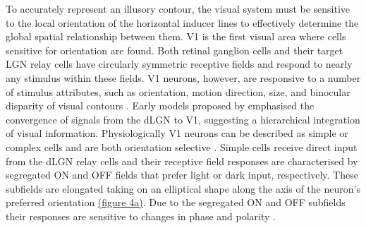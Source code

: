 \documentclass[12pt]{article}
\begin{document}


To accurately represent an illusory contour, the visual system must be sensitive to the local orientation of the horizontal inducer lines to effectively determine the global spatial relationship between them. V1 is the first visual area where cells sensitive for orientation are found. Both retinal ganglion cells and their target LGN relay cells have circularly symmetric receptive fields and respond to nearly any stimulus within these fields. V1 neurons, however, are responsive to a number of stimulus attributes, such as orientation, motion direction, size, and binocular disparity of visual contours \autocite{hubelReceptiveFieldsBinocular1962}. 
Early models proposed by \textcite{hubelReceptiveFieldsBinocular1962} emphasised the convergence of signals from the dLGN to V1, suggesting a hierarchical integration of visual information. Physiologically V1 neurons can be described as simple or complex cells and are both orientation selective \autocite{skottunClassifyingSimpleComplex1991}. Simple cells receive direct input from the dLGN relay cells and their receptive field responses are characterised by segregated ON and OFF fields that prefer light or dark input, respectively. These subfields are elongated taking on an elliptical shape along the axis of the neuron's preferred orientation \hyperref[fig:LIF_Overview]{(figure 4a)}. Due to the segregated ON and OFF subfields their responses are sensitive to changes in phase and polarity \autocite{mechlerClassificationSimpleComplex2002}. 
\end{document}
